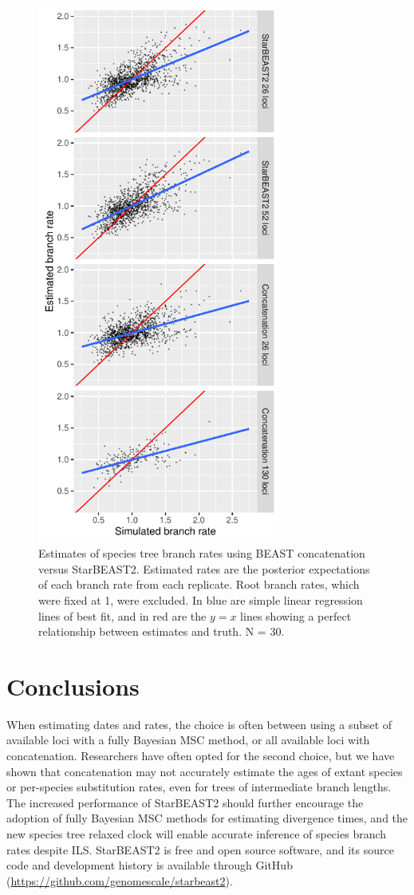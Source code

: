 \documentclass[nogrid]{MBE}%
\begin{document}
\begin{figure}[htb!]
\centering
\includegraphics[width=80mm]{branch_rates_phased.pdf}
\caption
{Estimates of species tree branch rates using BEAST concatenation versus
StarBEAST2. Estimated rates are the posterior expectations of each branch rate
from each replicate. Root branch rates, which were fixed at 1, were excluded.
In blue are simple linear regression lines of best fit, and in red are the $y
= x$ lines showing a perfect relationship between estimates and truth. N =
30.}
\label{fig:branchRates}
\end{figure}

\section{Conclusions}

When estimating dates and rates, the choice is often between using a subset of
available loci with a fully Bayesian MSC method, or all available loci with
concatenation. Researchers have often opted for the second choice, but we have
shown that concatenation may not accurately estimate the ages of extant species
or per-species substitution rates, even for trees of intermediate branch lengths. The
increased performance of StarBEAST2 should further encourage the adoption of
fully Bayesian MSC methods for estimating divergence times, and the new species
tree relaxed clock will enable accurate inference of species branch rates despite
ILS. StarBEAST2 is free and open source software, and its source code and
development history is available through GitHub
(\url{https://github.com/genomescale/starbeast2}).
\end{document}

